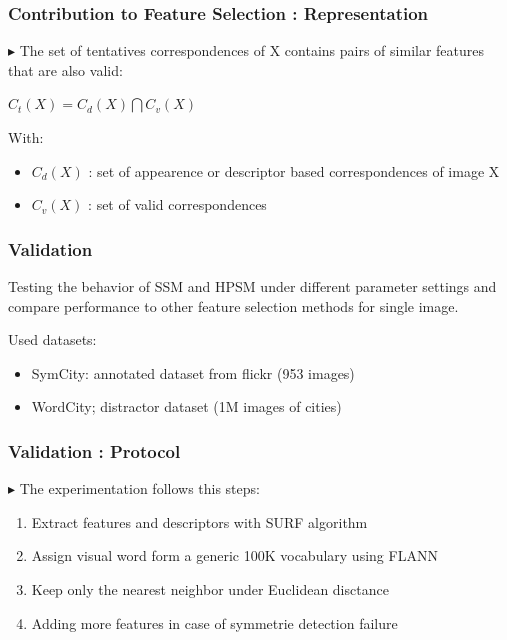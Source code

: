 \documentclass[11pt]{beamer}
\begin{document}
\begin{frame}
\frametitle{Contribution to Feature Selection : Representation}
$\blacktriangleright$ The set of tentatives correspondences of X contains pairs of similar features that are also valid:
\begin{center}
$C_t(X) = C_d(X) \bigcap C_v(X) $
\end{center}

With:
\begin{itemize}
\item $C_d(X)$ : set of appearence or descriptor based correspondences of image X
\item $C_v(X)$ : set of valid correspondences 
\end{itemize}
\end{frame}






\begin{frame}
\frametitle{Validation}
Testing the behavior of SSM and HPSM under different parameter settings and compare performance to other feature selection methods for single image.

\vspace{0.3cm}
Used datasets:
\begin{itemize}
\item SymCity: annotated dataset from flickr (953 images)
\item WordCity; distractor dataset (1M images of cities)
\end{itemize}

\end{frame}

\begin{frame}
\frametitle{Validation : Protocol}
$\blacktriangleright$ The experimentation follows this steps:
\begin{enumerate}
\item Extract features and descriptors with SURF algorithm
\item Assign visual word form a generic 100K vocabulary using FLANN
\item Keep only the nearest neighbor under Euclidean disctance
\item Adding more features in case of symmetrie detection failure 
\end{enumerate}
\end{frame}
\end{document}
